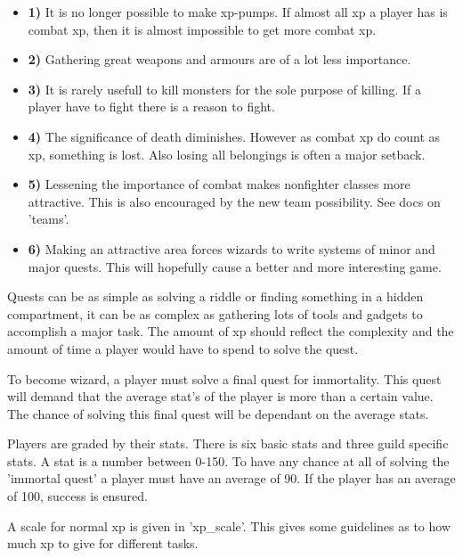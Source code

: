 \begin{itemize}
\item{\bf 1)} It is no longer possible to make xp-pumps. If almost all xp a player has
   is combat xp, then it is almost impossible to get more combat xp.

\item{\bf 2)} Gathering great weapons and armours are of a lot less importance.

\item{\bf 3)} It is rarely usefull to kill monsters for the sole purpose of killing. If
   a player have to fight there is a reason to fight.

\item{\bf 4)} The significance of death diminishes. However as combat xp do count as
   xp, something is lost. Also losing all belongings is often a major setback.

\item{\bf 5)} Lessening the importance of combat makes nonfighter classes more
   attractive. This is also encouraged by the new team possibility. See
   docs on 'teams'.

\item{\bf 6)} Making an attractive area forces wizards to write systems of minor and
   major quests. This will hopefully cause a better and more interesting game.
\end{itemize}

Quests can be as simple as solving a riddle or finding something in a hidden
compartment, it can be as complex as gathering lots of tools and gadgets to
accomplish a major task. The amount of xp should reflect the complexity
and the amount of time a player would have to spend to solve the quest.

To become wizard, a player must solve a final quest for immortality.
This quest will demand that the average stat's of the player is more than
a certain value. The chance of solving this final quest will be dependant
on the average stats.

Players are graded by their stats. There is six basic stats and three guild
specific stats. A stat is a number between 0-150. To have any chance at all
of solving the 'immortal quest' a player must have an average of 90. If the
player has an average of 100, success is ensured.

A scale for normal xp is given in 'xp\_scale'. This gives some guidelines
as to how much xp to give for different tasks. 



